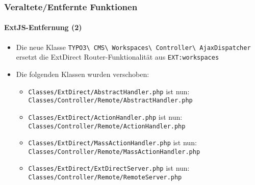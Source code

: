 \begin{frame}[fragile]
	\frametitle{Veraltete/Entfernte Funktionen}
	\framesubtitle{ExtJS-Entfernung (2)}

	\begin{itemize}
		\item Die neue Klasse
			\texttt{TYPO3\textbackslash
				CMS\textbackslash
				Workspaces\textbackslash
				Controller\textbackslash
				AjaxDispatcher}
			ersetzt die ExtDirect Router-Funktionalität aus \texttt{EXT:workspaces}

		\item Die folgenden Klassen wurden verschoben:

		\begin{itemize}
			\item \smaller\texttt{Classes/ExtDirect/AbstractHandler.php}\newline
				ist nun: \texttt{Classes/Controller/Remote/AbstractHandler.php}\normalsize

			\item \smaller\texttt{Classes/ExtDirect/ActionHandler.php}\newline
				ist nun: \texttt{Classes/Controller/Remote/ActionHandler.php}\normalsize

			\item \smaller\texttt{Classes/ExtDirect/MassActionHandler.php}\newline
				ist nun: \texttt{Classes/Controller/Remote/MassActionHandler.php}\normalsize

			\item \smaller\texttt{Classes/ExtDirect/ExtDirectServer.php}\newline
				ist nun: \texttt{Classes/Controller/Remote/RemoteServer.php}\normalsize

		\end{itemize}

	\end{itemize}

\end{frame}
